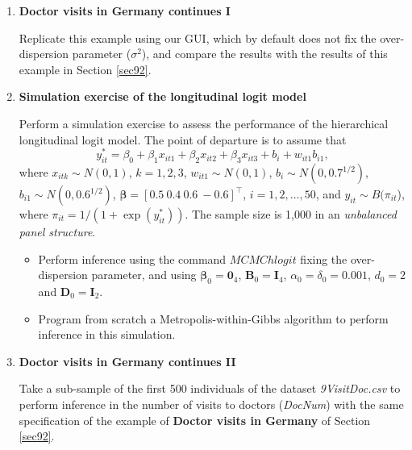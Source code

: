 \begin{enumerate}
\item \textbf{Doctor visits in Germany continues I}

Replicate this example using our GUI, which by default does not fix the over-dispersion parameter ($\sigma^2$), and compare the results with the results of this example in Section \ref{sec92}.

\item \textbf{Simulation exercise of the longitudinal logit model}

Perform a simulation exercise to assess the performance of the hierarchical longitudinal logit model. The point of departure is to assume that \[y_{it}^*=\beta_0+\beta_1x_{it1}+\beta_2x_{it2}+\beta_3x_{it3}+b_i+w_{it1}b_{i1},\]
where $x_{itk}\sim N(0,1)$, $k=1,2,3$, $w_{it1}\sim N(0,1)$, $b_i\sim N(0, 0.7^{1/2})$, $b_{i1}\sim N(0, 0.6^{1/2})$, $\bm{\beta}=[0.5 \ 0.4 \ 0.6 \ -0.6]^{\top}$, $i=1,2,\dots,50$, and $y_{it}\sim B(\pi_{it}$), where $\pi_{it}=1/(1+\exp(y_{it}^*))$. The sample size is 1,000 in an \textit{unbalanced panel structure}.

\begin{itemize}
	\item Perform inference using the command $MCMChlogit$ fixing the over-dispersion parameter, and using $\bm{\beta}_0=\bm{0}_4$, $\bm{B}_0=\bm{I}_4$, $\alpha_0=\delta_0=0.001$, $d_0=2$ and $\bm{D}_0=\bm{I}_2$.
	\item Program from scratch a Metropolis-within-Gibbs algorithm to perform inference in this simulation.  
\end{itemize} 

\item \textbf{Doctor visits in Germany continues II} 

Take a sub-sample of the first 500 individuals of the dataset \textit{9VisitDoc.csv} to perform inference in the number of visits to doctors (\textit{DocNum}) with the same specification of the example of \textbf{Doctor visits in Germany} of Section \ref{sec92}.	
\end{enumerate}